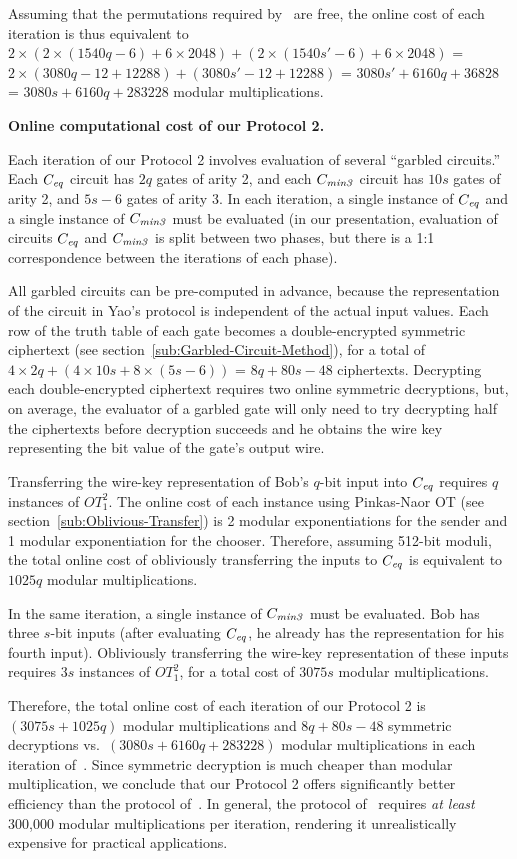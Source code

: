 Assuming that the permutations required by~\cite{atallah} are free,
the online cost of each iteration is thus equivalent to
$2 \times (2 \times (1540 q - 6) + 6 \times 2048) +
          (2 \times (1540 s' - 6) + 6 \times 2048)$ =
$2 \times (3080 q - 12 + 12288) +
          (3080 s' - 12 + 12288)$ =
$3080s' + 6160q + 36828$ =
$3080s + 6160q + 283228$ modular multiplications.

\vspace{1ex}
\noindent
\textbf{Online computational cost of our Protocol 2.}

Each iteration of our Protocol 2 involves evaluation of several ``garbled
circuits.''  Each $C_{\mathit{eq}}$ circuit has $2q$ gates of arity 2, and each
$C_{\mathit{min3}}$ circuit has $10s$ gates of arity 2, and $5s-6$ gates of arity 3.
In each iteration, a single instance of $C_{\mathit{eq}}$ and a single instance of
$C_{\mathit{min3}}$ must be evaluated (in our presentation, evaluation of circuits $C_{\mathit{eq}}$
and $C_{\mathit{min3}}$ is split between two phases, but there is a 1:1 correspondence
between the iterations of each phase).

All garbled circuits can be pre-computed in advance, because the
representation of the circuit in Yao's protocol is independent of the
actual input values.  Each row of the truth table of each gate becomes
a double-encrypted symmetric ciphertext (see section~\ref{sub:Garbled-Circuit-Method}), for
a total of $4 \times 2 q + (4 \times 10s +  8 \times (5s - 6))$ = $8q
+ 80s - 48$ ciphertexts.  Decrypting each double-encrypted ciphertext
requires two online symmetric decryptions, but, on average, the evaluator
of a garbled gate will only need to try decrypting half the ciphertexts
before decryption succeeds and he obtains the wire key representing the
bit value of the gate's output wire.

Transferring the wire-key representation of Bob's $q$-bit input into $C_{\mathit{eq}}$
requires $q$ instances of $OT_1^2$.  The online cost of each instance using Pinkas-Naor OT
(see section~\ref{sub:Oblivious-Transfer})
is 2 modular exponentiations for the sender and 1 modular exponentiation for the chooser.  Therefore,
assuming 512-bit moduli, the total online cost of obliviously transferring
the inputs to $C_{\mathit{eq}}$ is equivalent to $1025q$ modular multiplications.

In the same iteration, a single instance of $C_{\mathit{min3}}$ must be evaluated.
Bob has three $s$-bit inputs (after evaluating $C_{\mathit{eq}}$, he already has
the representation for his fourth input).  Obliviously transferring
the wire-key representation of these inputs requires $3s$ instances of
$OT_1^2$, for a total cost of $3075 s$ modular multiplications.

Therefore, the total online cost of each iteration of our Protocol
2 is $(3075 s + 1025 q)$ modular multiplications and $8q + 80s -
48$ symmetric decryptions vs.\ $(3080 s + 6160 q + 283228)$ modular
multiplications in each iteration of~\cite{atallah}.  Since symmetric
decryption is much cheaper than modular multiplication, we conclude
that our Protocol 2 offers significantly better efficiency than the
protocol of~\cite{atallah}.  In general, the protocol of~\cite{atallah}
requires \emph{at least} 300,000 modular multiplications per iteration,
rendering it unrealistically expensive for practical applications.

